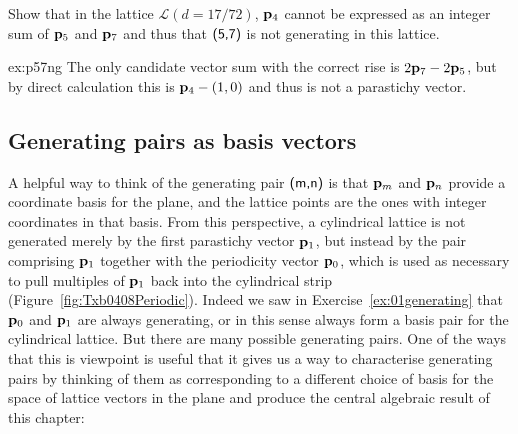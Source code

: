 \begin{jExercise}\label{ex:p57ng}
	Show that in the lattice $\mathcal{L}(d=17/72)$, ${\mathbf p}_{4}$ cannot be expressed as an integer sum of ${\mathbf p}_{5}$ and ${\mathbf p}_{7}$ and thus that $\textsf{(5,7)}$ is not generating in this lattice.
\end{jExercise}
\begin{jAnswer}{ex:p57ng}{
	The only candidate vector sum with the correct rise is $2{\mathbf p}_{7}-2{\mathbf p}_{5}$, but by direct calculation this is ${\mathbf p}_{4}-(1,0)$ and thus is not a parastichy vector. 
}\end{jAnswer}


\subsection{Generating pairs as basis vectors}
 A helpful way to think of the generating pair $\textsf{(m,n)}$ is that  ${\mathbf p}_{m}$ and ${\mathbf p}_{n}$ provide a coordinate basis for the plane, and the lattice points are the ones with integer coordinates in that basis. From this perspective, a cylindrical lattice is not generated merely by the first parastichy vector ${\mathbf p}_{1}$, but instead by  the pair comprising  ${\mathbf p}_{1}$ together with the periodicity vector ${\mathbf p}_{0}$, which is used as necessary to pull multiples of ${\mathbf p}_{1}$ back into the cylindrical strip (Figure~\ref{fig:Txb0408Periodic}).
 Indeed we saw in Exercise~\ref{ex:01generating} that ${\mathbf p}_{0}$ and ${\mathbf p}_{1}$ are always generating, or in this sense always form a basis pair for the cylindrical lattice. 
 But there are many possible generating pairs. 
 One of the ways that this is viewpoint is useful  that it gives us a way to characterise generating pairs by thinking of them as corresponding to a different choice of basis for the space of  lattice vectors in the plane and produce the central algebraic result of this chapter:

